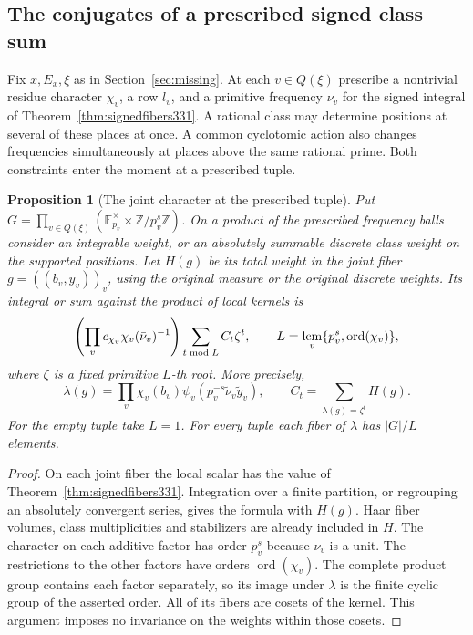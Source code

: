 \documentclass[a4paper,11pt]{article}
\newtheorem{proposition}{Proposition}[section]
\theoremstyle{definition}
\theoremstyle{remark}
\newcommand{\ZZ}{\mathbb Z}\newcommand{\ord}{\operatorname{ord}}
\numberwithin{equation}{section}
\begin{document}
\subsection{The conjugates of a prescribed signed class sum}\label{sec:fixedcolumn332}
Fix \(x,E_x,\xi\) as in Section~\ref{sec:missing}. At each
\(v\in Q(\xi)\) prescribe a nontrivial residue character \(\chi_v\),
a row \(l_v\), and a primitive frequency \(\nu_v\) for the signed
integral of Theorem~\ref{thm:signedfibers331}. A rational class may
determine positions at several of these places at once. A common
cyclotomic action also changes frequencies simultaneously at places
above the same rational prime. Both constraints enter the moment
at a prescribed tuple.

\begin{proposition}[The joint character at the prescribed tuple]\leavevmode
\label{prop:jointcharacter332}
Put \(G=\prod_{v\in Q(\xi)}(\mathbb F_{p_v}^\times\times\ZZ/p_v^s\ZZ)\).
On a product of the prescribed frequency balls consider an integrable
weight, or an absolutely summable discrete class weight on the
supported positions. Let \(H(g)\) be its total weight in the joint
fiber \(g=((b_v,y_v))_v\), using the original measure or the original
discrete weights. Its integral or sum against the product of local
kernels is
\[
   \left(\prod_v c_{\chi_v}\chi_v(\bar\nu_v)^{-1}\right)
            \sum_{t\bmod L} C_t\zeta^t ,
 \qquad
 L=\mathop{\rm lcm}_{v}\{p_v^s,\operatorname{ord}(\chi_v)\},
\]
where \(\zeta\) is a fixed primitive \(L\)-th root. More precisely,
\[
 \lambda(g)=\prod_v\chi_v(b_v)\psi_v(p_v^{-s}\widetilde\nu_v\widetilde y_v),
 \qquad
 C_t=\sum_{\lambda(g)=\zeta^t}H(g).
\]
For the empty tuple take \(L=1\). For every tuple each fiber of
\(\lambda\) has \(|G|/L\) elements.
\end{proposition}
\begin{proof}
On each joint fiber the local scalar has the value of
Theorem~\ref{thm:signedfibers331}. Integration over a finite
partition, or regrouping an absolutely convergent series, gives the
formula with \(H(g)\). Haar fiber volumes, class multiplicities and
stabilizers are already included in \(H\). The character on each
additive factor has order \(p_v^s\) because \(\nu_v\) is a unit.
The restrictions to the other factors have orders
\(\operatorname{ord}(\chi_v)\). The complete product group contains
each factor separately, so its image under \(\lambda\) is the finite
cyclic group of the asserted order. All of its fibers are cosets
of the kernel. This argument imposes no invariance on the weights
within those cosets.
\end{proof}
\end{document}
